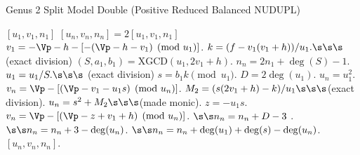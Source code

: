 \begin{algorithm}[htbp]
\caption{Genus 2 Split Model Double (Positive Reduced Balanced NUDUPL)}
\label{alg:g2balnudupl}
\begin{algorithmic}[1]
\Require $[u_1,v_1,n_1]$
\Ensure $[u_n,v_n,n_n] = 2[u_1,v_1,n_1]$
    \State $v_1 = -\Vp - h - [-(\Vp - h - v_1) \pmod{u_1}]$.
\EndIf
\State $k = (f - v_1(v_1 + h))/u_1. \s\s\s$ (exact division)
\State $(S,a_1,b_1) = \mathrm{XGCD}(u_1,2v_1 + h)$.
\State $n_n = 2n_1 + \deg(S) - 1$.
    \State $u_1 = u_1/S. \s\s\s$ (exact division)   
\EndIf
\State $s = b_1k \pmod{u_1}$.
\State $D = 2\deg(u_1)$.
    \State $u_n = u_1^2$.
    \State $v_n = \Vp - [(\Vp - v_1 - u_1s) \pmod{u_n}]$.
\Else
    \State $M_2 = (s(2v_1 + h) - k)/u_1 \s\s\s $(exact division).
    \State $u_n = s^2 + M_2 \s\s\s$(made monic).
    \State $z = -u_1s$.
    \State $v_n = \Vp - [(\Vp - z + v_1 + h) \pmod{u_n}]$.
         $\s\s n_n = n_n + D - 3$ .
        \Else \hspace{101pt} $\s\s n_n = n_n + 3 - \deg(u_n)$. 
        \EndIf
    \Else $\s\s n_n = n_n + \deg(u_1) + \deg(s) - \deg(u_n)$.
    \EndIf
\EndIf
\State \Return $[u_n,v_n,n_n]$.
\end{algorithmic}
\end{algorithm}


